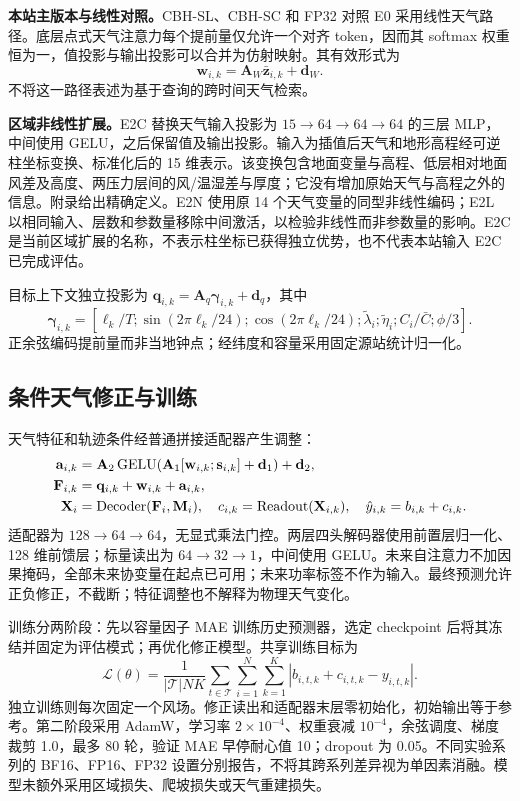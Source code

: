 \textbf{本站主版本与线性对照。}CBH-SL、CBH-SC 和 FP32 对照 E0 采用线性天气路径。底层点式天气注意力每个提前量仅允许一个对齐 token，因而其 softmax 权重恒为一，值投影与输出投影可以合并为仿射映射。其有效形式为
\begin{equation}
 \mathbf w_{i,k}=\mathbf A_W\bar{\mathbf z}_{i,k}+\mathbf d_W.
\end{equation}
不将这一路径表述为基于查询的跨时间天气检索。

\textbf{区域非线性扩展。}E2C 替换天气输入投影为 $15\rightarrow64\rightarrow64\rightarrow64$ 的三层 MLP，中间使用 GELU，之后保留值及输出投影。输入为插值后天气和地形高程经可逆柱坐标变换、标准化后的 15 维表示。该变换包含地面变量与高程、低层相对地面风差及高度、两压力层间的风/温湿差与厚度；它没有增加原始天气与高程之外的信息。附录给出精确定义。E2N 使用原 14 个天气变量的同型非线性编码；E2L 以相同输入、层数和参数量移除中间激活，以检验非线性而非参数量的影响。E2C 是当前区域扩展的名称，不表示柱坐标已获得独立优势，也不代表本站输入 E2C 已完成评估。

目标上下文独立投影为 $\mathbf q_{i,k}=\mathbf A_q\boldsymbol\gamma_{i,k}+\mathbf d_q$，其中
\begin{equation}
 \boldsymbol\gamma_{i,k}=[\ell_k/T;\sin(2\pi\ell_k/24);\cos(2\pi\ell_k/24);\tilde\lambda_i;\tilde\eta_i;C_i/\bar C;\phi/3].
\end{equation}
正余弦编码提前量而非当地钟点；经纬度和容量采用固定源站统计归一化。

\subsection{条件天气修正与训练}
天气特征和轨迹条件经普通拼接适配器产生调整：
\begin{align}
 \mathbf a_{i,k}&=\mathbf A_2\operatorname{GELU}\!\left(\mathbf A_1[\mathbf w_{i,k};\mathbf s_{i,k}]+\mathbf d_1\right)+\mathbf d_2,\\
 \mathbf F_{i,k}&=\mathbf q_{i,k}+\mathbf w_{i,k}+\mathbf a_{i,k},\\
 \mathbf X_i&=\operatorname{Decoder}(\mathbf F_i,\mathbf M_i),\quad
 c_{i,k}=\operatorname{Readout}(\mathbf X_{i,k}),\quad
 \hat y_{i,k}=b_{i,k}+c_{i,k}.
 \label{eq:prediction}
\end{align}
适配器为 $128\rightarrow64\rightarrow64$，无显式乘法门控。两层四头解码器使用前置层归一化、128 维前馈层；标量读出为 $64\rightarrow32\rightarrow1$，中间使用 GELU。未来自注意力不加因果掩码，全部未来协变量在起点已可用；未来功率标签不作为输入。最终预测允许正负修正，不截断；特征调整也不解释为物理天气变化。

训练分两阶段：先以容量因子 MAE 训练历史预测器，选定 checkpoint 后将其冻结并固定为评估模式；再优化修正模型。共享训练目标为
\begin{equation}
 \mathcal L(\theta)=\frac1{|\mathcal T|NK}\sum_{t\in\mathcal T}\sum_{i=1}^{N}\sum_{k=1}^{K}
 |b_{i,t,k}+c_{i,t,k}-y_{i,t,k}|.
\end{equation}
独立训练则每次固定一个风场。修正读出和适配器末层零初始化，初始输出等于参考。第二阶段采用 AdamW，学习率 $2\times10^{-4}$、权重衰减 $10^{-4}$，余弦调度、梯度裁剪 1.0，最多 80 轮，验证 MAE 早停耐心值 10；dropout 为 0.05。不同实验系列的 BF16、FP16、FP32 设置分别报告，不将其跨系列差异视为单因素消融。模型未额外采用区域损失、爬坡损失或天气重建损失。
